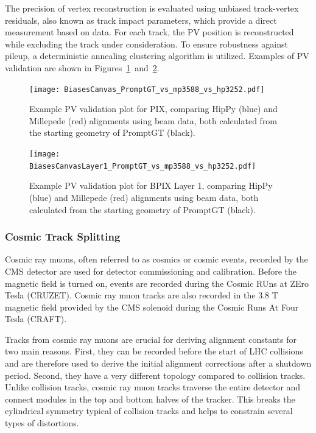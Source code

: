 The precision of vertex reconstruction is evaluated using unbiased track-vertex residuals, also known as track impact parameters, which provide a direct measurement based on data. For each track, the PV position is reconstructed while excluding the track under consideration. To ensure robustness against pileup, a deterministic annealing clustering algorithm is utilized. Examples of PV validation are shown in Figures~\ref{fig:BiasesCanvas_PromptGT_vs_mp3588_vs_hp3252}~and~\ref{fig:BiasesCanvasLayer1_PromptGT_vs_mp3588_vs_hp3252}.

\begin{figure}[!hbt]
    \begin{center}
        \texttt{[image: BiasesCanvas\_PromptGT\_vs\_mp3588\_vs\_hp3252.pdf]}
        \caption{Example PV validation plot for PIX, comparing HipPy (blue) and Millepede (red) alignments using beam data, both calculated from the starting geometry of PromptGT (black).}
        \label{fig:BiasesCanvas_PromptGT_vs_mp3588_vs_hp3252}
    \end{center}
\end{figure}
\begin{figure}[!hbt]
    \begin{center}
        \texttt{[image: BiasesCanvasLayer1\_PromptGT\_vs\_mp3588\_vs\_hp3252.pdf]}
        \caption{Example PV validation plot for BPIX Layer 1, comparing HipPy (blue) and Millepede (red) alignments using beam data, both calculated from the starting geometry of PromptGT (black).}
        \label{fig:BiasesCanvasLayer1_PromptGT_vs_mp3588_vs_hp3252}
    \end{center}
\end{figure}

\subsubsection{Cosmic Track Splitting}

Cosmic ray muons, often referred to as cosmics or cosmic events, recorded by the CMS detector are used for detector commissioning and calibration. Before the magnetic field is turned on, events are recorded during the Cosmic RUns at ZEro Tesla (CRUZET). Cosmic ray muon tracks are also recorded in the 3.8 T magnetic field provided by the CMS solenoid during the Cosmic Runs At Four Tesla (CRAFT).

Tracks from cosmic ray muons are crucial for deriving alignment constants for two main reasons. First, they can be recorded before the start of LHC collisions and are therefore used to derive the initial alignment corrections after a shutdown period. Second, they have a very different topology compared to collision tracks. Unlike collision tracks, cosmic ray muon tracks traverse the entire detector and connect modules in the top and bottom halves of the tracker. This breaks the cylindrical symmetry typical of collision tracks and helps to constrain several types of distortions.

